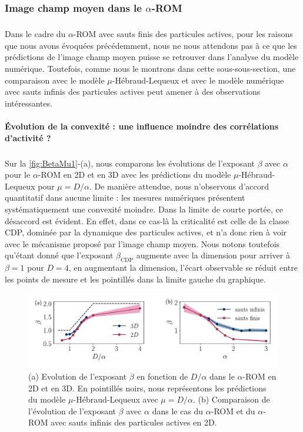 \subsubsection{Image champ moyen dans le $\alpha$-ROM}

\subparagraph{}Dans le cadre du $\alpha$-ROM avec sauts finis des particules actives, pour les raisons que nous avons évoquées précédemment, nous ne nous attendons pas à ce que les prédictions de l'image champ moyen puisse se retrouver dans l'analyse du modèle numérique. Toutefois, comme nous le montrons dans cette sous-sous-section, une comparaison avec le modèle $\mu$-Hébraud-Lequeux et avec le modèle numérique avec sauts infinis des particules actives peut amener à des observations intéressantes.

\paragraph{Évolution de la convexité : une influence moindre des corrélations d'activité ?}

\subparagraph{}Sur la \autoref{fig:BetaMu1}-(a), nous comparons les évolutions de l'exposant $\beta$ avec $\alpha$ pour le $\alpha$-ROM en 2D et en 3D avec les prédictions du modèle $\mu$-Hébraud-Lequeux pour $\mu = D/\alpha$. De manière attendue, nous n'observons d'accord quantitatif dans aucune limite : les mesures numériques présentent systématiquement une convexité moindre. Dans la limite de courte portée, ce désaccord est évident. En effet, dans ce cas-là la criticalité est celle de la classe CDP, dominée par la dynamique des particules actives, et n'a donc rien à voir avec le mécanisme proposé par l'image champ moyen. Nous notons toutefois qu'étant donné que l'exposant $\beta_\text{CDP}$ augmente avec la dimension pour arriver à $\beta = 1$ pour $D=4$, en augmentant la dimension, l'écart observable se réduit entre les points de mesure et les pointillés dans la limite gauche du graphique.

\begin{figure}[h]
	\centering
	\includegraphics[width = \textwidth]{Chapitre3/Figures/Interpretation/Beta_Mu1.pdf}
	\caption{(a) Evolution de l'exposant $\beta$ en fonction de $D/\alpha$ dans le $\alpha$-ROM en 2D et en 3D. En pointillés noirs, nous représentons les prédictions du modèle $\mu$-Hébraud-Lequeux avec $\mu = D/\alpha$. (b) Comparaison de l'évolution de l'exposant $\beta$ avec $\alpha$ dans le cas du $\alpha$-ROM et du $\alpha$-ROM avec sauts infinis des particules actives en 2D.}
	\label{fig:BetaMu1}
\end{figure}

